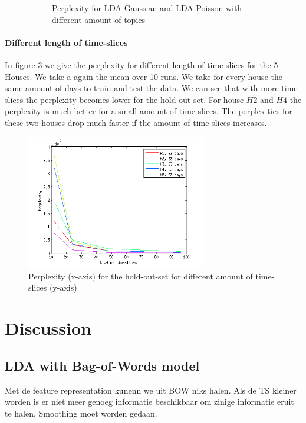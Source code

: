 \documentclass[a4paper,fleqn]{article}
\begin{document}
\begin{figure}[h!]
\begin{subfigure}[b]{0.45\linewidth}
\caption{Perplexity for LDA-Gaussian and LDA-Poisson with different amount of topics}
  \label{fig:CompareK}
 \end{subfigure}
 \caption{}
 \label{fig:Compare}
\end{figure}


\paragraph{Different length of time-slices}

In figure \ref{fig:PerplTS} we give the perplexity for different length of time-slices for the 5 Houses. We take a again the mean over 10 runs. We take for every house the same amount of days to train and test the data. We can see that with more time-slices the perplexity becomes lower for the hold-out set. For house $H2$ and $H4$ the perplexity is much better for a small amount of time-slices. The perplexities for these two houses drop much faster if the amount of time-slices increases.

\begin{figure}[h!]
 \centering
 \includegraphics[width = 0.7\textwidth]{Pictures/PerplTS.png}
 \caption{Perplexity (x-axis) for the hold-out-set for different amount of time-slices (y-axis)}
 \label{fig:PerplTS}
\end{figure}


\pagebreak
 

\section{Discussion}
\label{sec:Disc}

\subsection{LDA with Bag-of-Words model}
Met de feature representation kunenn we uit BOW niks halen. Als de TS kleiner worden is er niet meer genoeg informatie beschikbaar om zinige informatie eruit te halen.
Smoothing moet worden gedaan.
\end{document}
